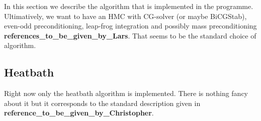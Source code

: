 In this section we describe the algorithm that is implemented in the programme. Ultimatively, we want to have an HMC with CG-solver (or maybe BiCGStab), even-odd preconditioning, leap-frog integration and possibly mass preconditioning {\bf references\_to\_be\_given\_by\_Lars}. That seems to be the standard choice of algorithm.

\subsection{Heatbath}
Right now only the heatbath algorithm is implemented. There is nothing fancy about it but it corresponds to the standard description given in {\bf reference\_to\_be\_given\_by\_Christopher}.